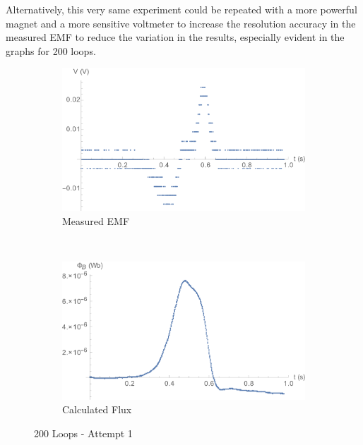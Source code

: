 \documentclass[a4paper]{scrartcl}
\begin{document}
Alternatively, this very same experiment could be repeated with a more powerful magnet and a more sensitive voltmeter to increase the resolution accuracy in the measured EMF to reduce the variation in the results, especially evident in the graphs for 200 loops.

\begin{figure}[p]
    \centering
    \begin{subfigure}[b]{0.45\textwidth}
        \includegraphics[width = \textwidth]{200_1_voltage.png}
        \caption{Measured EMF}
    \end{subfigure}
    ~
    \begin{subfigure}[b]{0.45\textwidth}
        \includegraphics[width = \textwidth]{200_1_flux.png}
        \caption{Calculated Flux}
    \end{subfigure}
    \caption{200 Loops - Attempt 1}
    \label{fig:200_1}
\end{figure}
\end{document}
